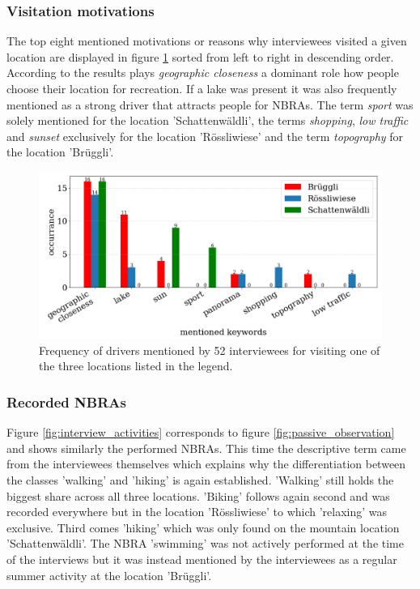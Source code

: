 \subsubsection{Visitation motivations}
The top eight mentioned motivations or reasons why interviewees visited a given location are displayed in figure \ref{fig:interview_visitation_motivation} sorted from left to right in descending order. According to the results plays \textit{geographic closeness} a dominant role how people choose their location for recreation. If a lake was present it was also frequently mentioned as a strong driver that attracts people for NBRAs. The term \textit{sport} was solely mentioned for the location 'Schattenw\"aldli', the terms \textit{shopping}, \textit{low traffic} and \textit{sunset} exclusively for the location 'R\"ossliwiese' and the term \textit{topography} for the location 'Br\"uggli'.

\begin{figure}[h!]
   \centering
   \includegraphics[width=\textwidth]{img/interview_keywords.pdf}
   \caption{Frequency of drivers mentioned by 52 interviewees for visiting one of the three locations listed in the legend.}
   \label{fig:interview_visitation_motivation}
\end{figure}

\subsubsection{Recorded NBRAs}
Figure \ref{fig:interview_activities} corresponds to figure \ref{fig:passive_observation} and shows similarly the performed NBRAs. This time the descriptive term came from the interviewees themselves which explains why the differentiation between the classes 'walking' and 'hiking' is again established. 'Walking' still holds the biggest share across all three locations. 'Biking' follows again second and was recorded everywhere but in the location 'R\"ossliwiese' to which 'relaxing' was exclusive. Third comes 'hiking' which was only found on the mountain location 'Schattenw\"aldli'. The NBRA 'swimming' was not actively performed at the time of the interviews but it was instead mentioned by the interviewees as a regular summer activity at the location 'Br\"uggli'.

